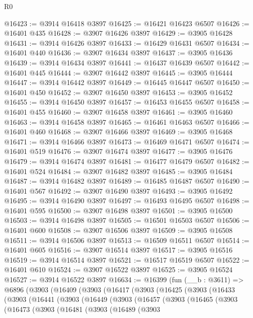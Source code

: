 \begin{lexlean}{R0}
\begin{coremodule}
@16423 := @3914 @16418 @3897
@16425 := @16421 @16423 @6507
@16426 := @16401 @435
@16428 := @3907 @16426 @3897
@16429 := @3905 @16428
@16431 := @3914 @16426 @3897
@16433 := @16429 @16431 @6507
@16434 := @16401 @440
@16436 := @3907 @16434 @3897
@16437 := @3905 @16436
@16439 := @3914 @16434 @3897
@16441 := @16437 @16439 @6507
@16442 := @16401 @445
@16444 := @3907 @16442 @3897
@16445 := @3905 @16444
@16447 := @3914 @16442 @3897
@16449 := @16445 @16447 @6507
@16450 := @16401 @450
@16452 := @3907 @16450 @3897
@16453 := @3905 @16452
@16455 := @3914 @16450 @3897
@16457 := @16453 @16455 @6507
@16458 := @16401 @455
@16460 := @3907 @16458 @3897
@16461 := @3905 @16460
@16463 := @3914 @16458 @3897
@16465 := @16461 @16463 @6507
@16466 := @16401 @460
@16468 := @3907 @16466 @3897
@16469 := @3905 @16468
@16471 := @3914 @16466 @3897
@16473 := @16469 @16471 @6507
@16474 := @16401 @519
@16476 := @3907 @16474 @3897
@16477 := @3905 @16476
@16479 := @3914 @16474 @3897
@16481 := @16477 @16479 @6507
@16482 := @16401 @524
@16484 := @3907 @16482 @3897
@16485 := @3905 @16484
@16487 := @3914 @16482 @3897
@16489 := @16485 @16487 @6507
@16490 := @16401 @567
@16492 := @3907 @16490 @3897
@16493 := @3905 @16492
@16495 := @3914 @16490 @3897
@16497 := @16493 @16495 @6507
@16498 := @16401 @595
@16500 := @3907 @16498 @3897
@16501 := @3905 @16500
@16503 := @3914 @16498 @3897
@16505 := @16501 @16503 @6507
@16506 := @16401 @600
@16508 := @3907 @16506 @3897
@16509 := @3905 @16508
@16511 := @3914 @16506 @3897
@16513 := @16509 @16511 @6507
@16514 := @16401 @605
@16516 := @3907 @16514 @3897
@16517 := @3905 @16516
@16519 := @3914 @16514 @3897
@16521 := @16517 @16519 @6507
@16522 := @16401 @610
@16524 := @3907 @16522 @3897
@16525 := @3905 @16524
@16527 := @3914 @16522 @3897
@16634 := @16399
    (fun (__b : @3611) =>
    @6896
      (@3903
        (@16409
          (@3903
            (@16417
              (@3903
                (@16425
                  (@3903
                    (@16433
                      (@3903
                        (@16441
                          (@3903
                            (@16449
                              (@3903
                                (@16457
                                  (@3903
                                    (@16465
                                      (@3903
                                        (@16473
                                          (@3903
                                            (@16481
                                              (@3903
                                                (@16489
                                                  (@3903

\end{coremodule}
\end{lexlean}
